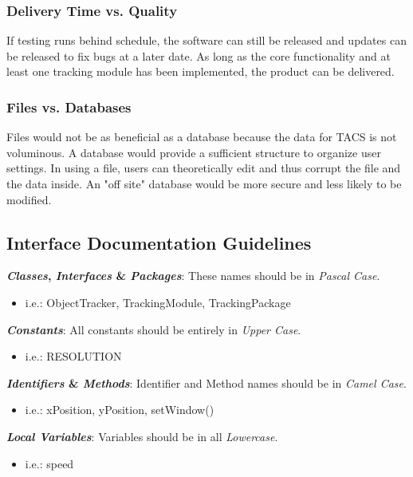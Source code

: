 \documentclass[titlepage]{article}
\begin{document}
\subsubsection{Delivery Time vs. Quality}
If testing runs behind schedule, the software can still be released and updates can be released to fix bugs at a later date. As long as the core functionality and at least one tracking module has been implemented, the product can be delivered.

\subsubsection{Files vs. Databases}
Files would not be as beneficial as a database because the data for TACS is not voluminous. A database would provide a sufficient structure to organize user settings. In using a file, users can theoretically edit and thus corrupt the file and the data inside. An "off site" database would be more secure and less likely to be modified.

\subsection{Interface Documentation Guidelines}
\textbf{\textit{Classes}, \textit{Interfaces} \& \textit{Packages}}: These names should be in \textit{Pascal Case}.
\begin{itemize}
	\item i.e.: ObjectTracker, TrackingModule, TrackingPackage
\end{itemize}
\textbf{\textit{Constants}}: All constants should be entirely in \textit{Upper Case}.
\begin{itemize}
	\item i.e.: RESOLUTION
\end{itemize}
\textbf{\textit{Identifiers} \& \textit{Methods}}: Identifier and Method names should be in \textit{Camel Case}.
\begin{itemize}
	\item i.e.: xPosition, yPosition, setWindow()
\end{itemize}
\textbf{\textit{Local Variables}}: Variables should be in all \textit{Lowercase}.
\begin{itemize}
	\item i.e.: speed
\end{itemize}
\end{document}

